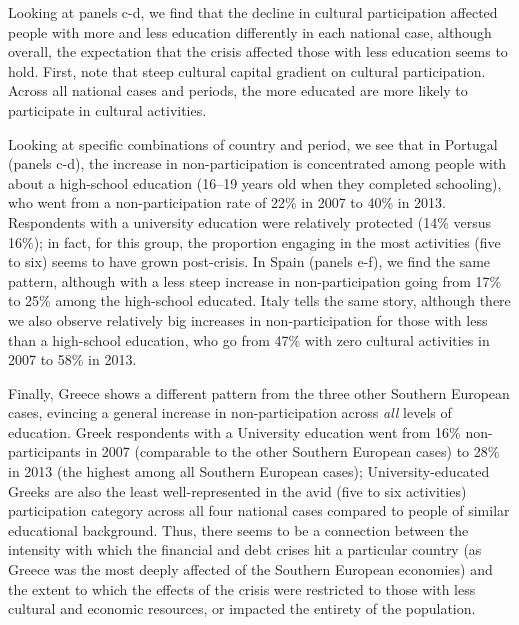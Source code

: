 \documentclass{article}
\begin{document}
Looking at panels c-d, we find that the decline in cultural participation affected people with more and less education differently in each national case, although overall, the expectation that the crisis affected those with less education seems to hold. First, note that steep cultural capital gradient on cultural participation. Across all national cases and periods, the more educated are more likely to participate in cultural activities.  

Looking at specific combinations of country and period, we see that in Portugal (panels c-d), the increase in non-participation is concentrated among people with about a high-school education (16–19 years old when they completed schooling), who went from a non-participation rate of 22\% in 2007 to 40\% in 2013. Respondents with a university education were relatively protected (14\% versus 16\%); in fact, for this group, the proportion engaging in the most activities (five to six) seems to have grown post-crisis. In Spain (panels e-f), we find the same pattern, although with a less steep increase in non-participation going from 17\% to 25\% among the high-school educated. Italy tells the same story, although there we also observe relatively big increases in non-participation for those with less than a high-school education, who go from 47\% with zero cultural activities in 2007 to 58\% in 2013. 

Finally, Greece shows a different pattern from the three other Southern European cases, evincing a general increase in non-participation across {\em all} levels of education. Greek respondents with a University education went from 16\% non-participants in 2007 (comparable to the other Southern European cases) to 28\% in 2013 (the highest among all Southern European cases); University-educated Greeks are also the least well-represented in the avid (five to six activities) participation category across all four national cases compared to people of similar educational background. Thus, there seems to be a connection between the intensity with which the financial and debt crises hit a particular country (as Greece was the most deeply affected of the Southern European economies) and the extent to which the effects of the crisis were restricted to those with less cultural and economic resources, or impacted the entirety of the population. 
\end{document}
